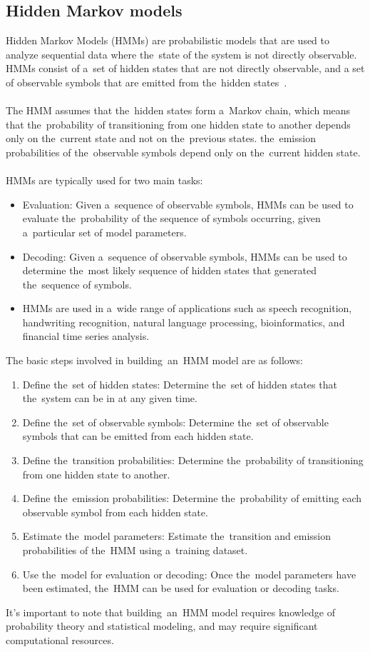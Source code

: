 \subsection{Hidden Markov models}\label{subsec:hmm}
Hidden Markov Models (HMMs) are probabilistic models that are used to analyze sequential data where the~state of the
system is not directly observable. HMMs consist of a~set of hidden states that are not directly observable, and a
set of observable symbols that are emitted from the~hidden states~\cite{math10081230}.\\
\\
The HMM assumes that the~hidden states form a~Markov chain, which means that the~probability of transitioning from
one hidden state to another depends only on the~current state and not on the~previous states. the~emission
probabilities of the~observable symbols depend only on the~current hidden state.\\
\\
HMMs are typically used for two main tasks:
\begin{itemize}
    \item Evaluation: Given a~sequence of observable symbols, HMMs can be used to evaluate the~probability of the
    sequence of symbols occurring, given a~particular set of model parameters.
    \item Decoding: Given a~sequence of observable symbols, HMMs can be used to determine the~most likely
    sequence of hidden states that generated the~sequence of symbols.
    \item HMMs are used in a~wide range of applications such as speech recognition, handwriting recognition, natural
    language processing, bioinformatics, and financial time series analysis.
\end{itemize}
The basic steps involved in building~an~HMM model are as follows:
\begin{enumerate}
    \item Define the~set of hidden states: Determine the~set of hidden states that the~system can be in at any given time.
    \item Define the~set of observable symbols: Determine the~set of observable symbols that can be emitted from each hidden state.
    \item Define the~transition probabilities: Determine the~probability of transitioning from one hidden state to another.
    \item Define the~emission probabilities: Determine the~probability of emitting each observable symbol from each hidden state.
    \item Estimate the~model parameters: Estimate the~transition and emission probabilities of the~HMM using a~training dataset.
    \item Use the~model for evaluation or decoding: Once the~model parameters have been estimated, the~HMM
    can be used for evaluation or decoding tasks.
\end{enumerate}
It's important to note that building~an~HMM model requires knowledge of probability theory and statistical
modeling, and may require significant computational resources.



